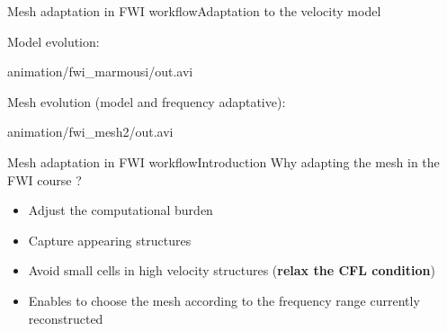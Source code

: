 \begin{frame}[noframenumbering]{Mesh adaptation in FWI workflow}{Adaptation to the velocity model}
  \begin{block}{Model evolution:}
    \begin{center}
            {animation/fwi_marmousi/out.avi}
    \end{center}
  \end{block}

  \begin{block}{Mesh evolution (model and frequency adaptative):}
    \begin{center}
            {animation/fwi_mesh2/out.avi}
    \end{center}
  \end{block}
\end{frame}







\begin{frame}{Mesh adaptation in FWI workflow}{Introduction}
  Why adapting the mesh in the FWI course ?
  \vspace{1cm}
  \begin{itemize}
  \item<2->{Adjust the computational burden}
  \item<3->{ Capture appearing structures}
  \item<4->{Avoid small cells in high velocity structures (\textbf{relax the CFL condition})}
  \item<5->{Enables to choose the mesh according to the frequency range currently reconstructed}
  \end{itemize}
\end{frame}



